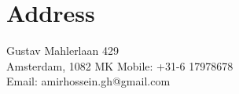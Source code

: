 \section{Address}

\begin{flushleft}
  Gustav Mahlerlaan 429 \\
  Amsterdam, 1082 MK
  Mobile: +31-6 17978678 \\
  Email: amirhossein.gh@gmail.com \\
\end{flushleft}

